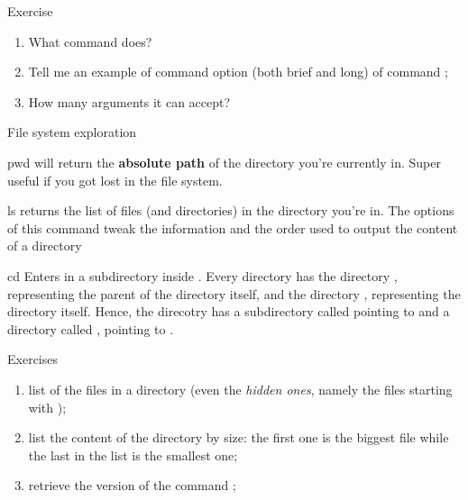 \begin{frame}{Exercise}

	\begin{enumerate}
		\item<1-> What  command does?
		\item<2-> Tell me an example of command option (both brief and long) of command ;
		\item<3-> How many arguments it can accept?
	\end{enumerate}
	
\end{frame}

\begin{frame}{File system exploration}

	\begin{block}{pwd}
		 will return the \textbf{absolute path} of the directory you're currently in. Super useful if you got lost in the file system.
	\end{block}
	
	\begin{block}{ls}
		returns the list of files (and directories) in the directory you're in. The options of this command tweak the information and the order used to output the content of a directory
	\end{block}
	
	\begin{block}{cd}
		Enters in a subdirectory inside . Every directory has the directory , representing the parent of the directory itself, and the directory , representing the directory itself. Hence, the direcotry  has a subdirectory called  pointing to  and a directory called , pointing to .
	\end{block}

\end{frame}

\begin{frame}{Exercises}
	\begin{enumerate}
		\item<1-> list of the files in a directory (even the \textit{hidden ones}, namely the files starting with );
		\item<2-> list the content of the directory by size: the first one is the biggest file while the last in the list is the smallest one;
		\item<3-> retrieve the version of the command ;
	\end{enumerate}
\end{frame}

